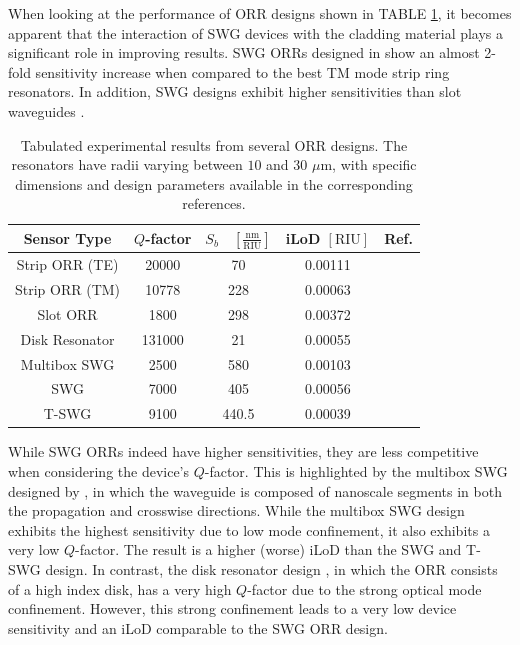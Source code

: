 \documentclass[aps,prl,twocolumn, superscriptaddress,nobalancelastpage]{revtex4}
\begin{document}

When looking at the performance of ORR designs shown in TABLE \ref{tab1}, it becomes apparent that the interaction of SWG devices with the cladding material plays a significant role in improving results. SWG ORRs designed in \cite{swg3} show an almost 2-fold sensitivity increase when compared to the best TM mode strip ring resonators. In addition, SWG designs \cite{swg3, TSWGbio, MultiboxSensor} exhibit higher sensitivities than slot waveguides \cite{SlotBiosensor}.
\pagebreak
\begin{table}[!h]
\centering
\begin{tabular}{|c|c|c|c|c|}
\hline
\textbf{Sensor Type} & \textbf{$Q$-factor} & \textbf{$S_b \quad \left[\frac{\text{nm}}{\text{RIU}}\right] $} & \textbf{iLoD $\left[\text{RIU}\right]$} & \textbf{Ref.} \\ \hline
Strip ORR (TE) & 20000 & 70 & 0.00111 & \cite{TEsensor} \\ \hline
Strip ORR (TM) & 10778 & 228 & 0.00063 & \cite{StripBiosensor} \\ \hline
Slot ORR & 1800 & 298 & 0.00372 & \cite{SlotBiosensor} \\ \hline
Disk Resonator & 131000 & 21 & 0.00055 & \cite{DiskSensor} \\ \hline
Multibox SWG & 2500 & 580 & 0.00103 & \cite{MultiboxSensor} \\ \hline
SWG & 7000 & 405 & 0.00056 & \cite{swg3} \\ \hline
T-SWG & 9100 & 440.5 & 0.00039 & \cite{TSWGbio} \\ \hline
\end{tabular}
\caption{Tabulated experimental results from several ORR designs. The resonators have radii varying between $10$ and $30$ $\mu$m, with specific dimensions and design parameters available in the corresponding references.}
\label{tab1}
\end{table}

While SWG ORRs indeed have higher sensitivities, they are less competitive when considering the device's $Q$-factor. This is highlighted by the multibox SWG designed by \cite{MultiboxSensor}, in which the waveguide is composed of nanoscale segments in both the propagation and crosswise directions. While the multibox SWG design exhibits the highest sensitivity due to low mode confinement, it also exhibits a very low $Q$-factor. The result is a higher (worse) iLoD than the SWG and T-SWG design. In contrast, the disk resonator design \cite{DiskSensor}, in which the ORR consists of a high index disk, has a very high $Q$-factor due to the strong optical mode confinement. However, this strong confinement leads to a very low device sensitivity and an iLoD comparable to the SWG ORR design. 
\end{document}
